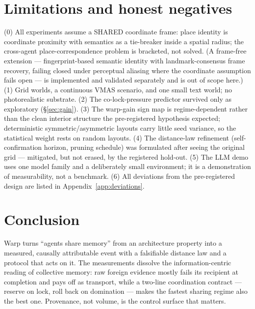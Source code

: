 \documentclass{article}
\begin{document}
\section{Limitations and honest negatives}
\label{sec:limits}

(0) All experiments assume a SHARED coordinate frame: place identity
is coordinate proximity with semantics as a tie-breaker inside a
spatial radius; the cross-agent place-correspondence problem is
bracketed, not solved. (A frame-free extension --- fingerprint-based
semantic identity with landmark-consensus frame recovery, failing
closed under perceptual aliasing where the coordinate assumption fails
open --- is implemented and validated separately and is out of scope
here.) (1) Grid worlds, a continuous VMAS scenario, and one small text
world; no photorealistic substrate. (2) The
co-lock-pressure predictor survived only as exploratory
(\S\ref{sec:gain}). (3) The warp-gain sign map is regime-dependent
rather than the clean interior structure the pre-registered
hypothesis expected; deterministic symmetric/asymmetric layouts carry
little seed variance, so the statistical weight rests on random
layouts. (4) The distance-law refinement (self-confirmation horizon,
pruning schedule) was formulated after seeing the original grid ---
mitigated, but not erased, by the registered hold-out. (5) The LLM
demo uses one model family and a deliberately small environment; it is
a demonstration of measurability, not a benchmark. (6) All deviations
from the pre-registered design are listed in
Appendix~\ref{app:deviations}.

\section{Conclusion}

Warp turns ``agents share memory'' from an architecture property into
a measured, causally attributable event with a falsifiable distance
law and a protocol that acts on it. The measurements dissolve the
information-centric reading of collective memory: raw foreign evidence
mostly fails its recipient at completion and pays off as transport,
while a two-line coordination contract --- reserve on lock, roll back
on domination --- makes the fastest sharing regime also the best one.
Provenance, not volume, is the control surface that matters.
\end{document}
